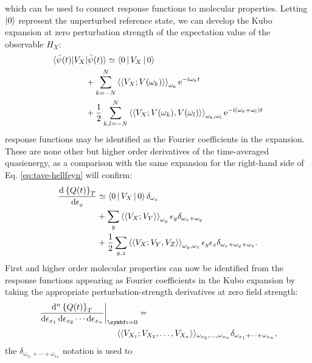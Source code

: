 which can be used to connect response functions to molecular properties.
Letting $\ket{0}$ represent the unperturbed reference state, we can
develop the Kubo expansion at zero perturbation strength of the
expectation value of the observable $H_X$:\autocite{Kubo1957-ay}
\begin{equation}
\begin{aligned}
  \langle \bar{\psi}(t) | V_X &| \bar{\psi}(t) \rangle
  \simeq
 \Braket{0|V_X|0} \\
 &+\sum_{k=-N}^N
 \braket{\braket{V_X; V(\omega_k)}}_{\omega_k}\mathrm{e}^{-\mathrm{i}\omega_k t} \\
 &+\frac{1}{2}\sum_{k,l=-N}^N
 \braket{\braket{V_X; V(\omega_k),V(\omega_l)}}_{\omega_k,\omega_l}\mathrm{e}^{-\mathrm{i}(\omega_k+\omega_l)t}
\end{aligned}
\end{equation}
response functions may be identified as the Fourier coefficients in the
expansion. These are none other but higher order derivatives of the
time-averaged quasienergy, as a comparison with the same expansion for
the right-hand side of Eq. \eqref{eq:tave-hellfeyn} will confirm:
\begin{equation}\label{eq:kubo}
\begin{aligned}
  \frac{\mathop{}\!\mathrm{d}^{}\left\lbrace Q(t)\right\rbrace_T}{\mathop{}\!\mathrm{d} \epsilon_x^{}}
  &\simeq \Braket{0|V_X|0}\delta_{\omega_x} \\
  &+\sum_{y}\braket{\braket{V_X; V_Y}}_{\omega_y}\epsilon_y\delta_{\omega_x+\omega_y} \\
  &+\frac{1}{2}\sum_{y,z}\braket{\braket{V_X; V_Y,V_Z}}_{\omega_y,\omega_z}\epsilon_y\epsilon_z\delta_{\omega_x+\omega_y+\omega_z}.
\end{aligned}
\end{equation}
First and higher order molecular properties can now be identified from
the response functions appearing as Fourier coefficients in the Kubo
expansion by taking the appropriate perturbation-strength derivatives at
zero field strength:
\begin{equation}\label{eq:nth-order-derivative}
  \begin{aligned}
  \left.\frac{\diff^n \aveQ}{\diff\epsilon_{x_1}\diff\epsilon_{x_2}\cdots\diff\epsilon_{x_n}} \right|_{\vect{\epsilon}=0}
  &= \\
  \langle\langle
  V_{X_1}&; V_{X_2}, \ldots, V_{X_n}
  \rangle\rangle_{\omega_{x_2},\ldots,\omega_{x_n}}
  \delta_{\omega_{x_1}+\cdots+\omega_{x_n}},
  \end{aligned}
\end{equation}
the $\delta_{\omega_{x_1}+\cdots+\omega_{x_n}}$ notation is used to
